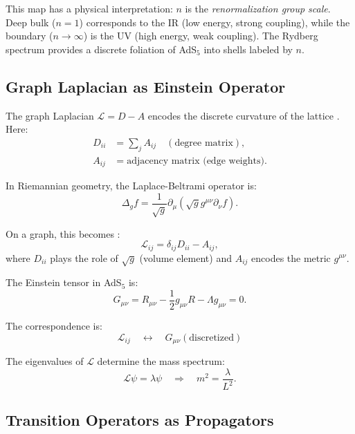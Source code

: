 \documentclass[aps,prd,twocolumn,superscriptaddress,floatfix]{revtex4-2}
\begin{document}
This map has a physical interpretation: $n$ is the \textit{renormalization group scale}. Deep bulk ($n=1$) corresponds to the IR (low energy, strong coupling), while the boundary ($n \to \infty$) is the UV (high energy, weak coupling). The Rydberg spectrum provides a discrete foliation of AdS$_5$ into shells labeled by $n$.

\subsection{Graph Laplacian as Einstein Operator}

The graph Laplacian $\mathcal{L} = D - A$ encodes the discrete curvature of the lattice \cite{companion_lattice}. Here:
\begin{align}
D_{ii} &= \sum_j A_{ij} \quad (\text{degree matrix}), \\
A_{ij} &= \text{adjacency matrix (edge weights)}.
\end{align}

In Riemannian geometry, the Laplace-Beltrami operator is:
\begin{equation}
\Delta_g f = \frac{1}{\sqrt{g}} \partial_\mu \left( \sqrt{g} g^{\mu\nu} \partial_\nu f \right).
\end{equation}

On a graph, this becomes \cite{chung1997}:
\begin{equation}
\mathcal{L}_{ij} = \delta_{ij} D_{ii} - A_{ij},
\end{equation}
where $D_{ii}$ plays the role of $\sqrt{g}$ (volume element) and $A_{ij}$ encodes the metric $g^{\mu\nu}$.

The Einstein tensor in AdS$_5$ is:
\begin{equation}
G_{\mu\nu} = R_{\mu\nu} - \frac{1}{2}g_{\mu\nu}R - \Lambda g_{\mu\nu} = 0.
\end{equation}

The correspondence is:
\begin{equation}
\boxed{\mathcal{L}_{ij} \quad \longleftrightarrow \quad G_{\mu\nu}(\text{discretized})}
\end{equation}

The eigenvalues of $\mathcal{L}$ determine the mass spectrum:
\begin{equation}
\mathcal{L} \psi = \lambda \psi \quad \Rightarrow \quad m^2 = \frac{\lambda}{L^2}.
\end{equation}

\subsection{Transition Operators as Propagators}
\end{document}
